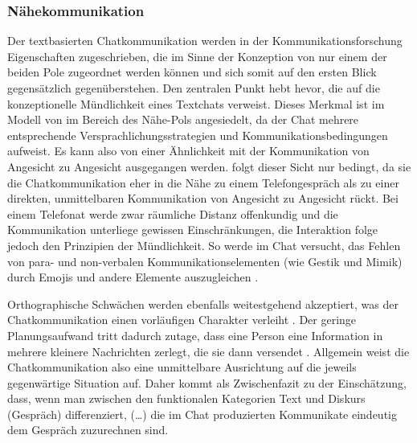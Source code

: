 \subsubsection{Nähekommunikation}
\begin{sloppypar}
Der textbasierten Chatkommunikation werden in der Kommunikationsforschung Eigenschaften zugeschrieben, die im Sinne der Konzeption von \citeauthor{koch_gesprochene_2011} nur einem der beiden Pole zugeordnet werden können und sich somit auf den ersten Blick gegensätzlich gegenüberstehen. Den zentralen Punkt hebt \citet[446]{storrer_getippte_2001} hevor, die auf die konzeptionelle Mündlichkeit eines Textchats verweist. Dieses Merkmal ist im Modell von \citeauthor{koch_gesprochene_2011} im Bereich des Nähe-Pols angesiedelt, da der Chat mehrere entsprechende Versprachlichungsstrategien und Kommunikationsbedingungen aufweist. Es kann also von einer Ähnlichkeit mit der Kommunikation von Angesicht zu Angesicht ausgegangen werden. \citet[35]{durscheid_neue_2016} folgt dieser Sicht nur bedingt, da sie die Chatkommunikation eher in die Nähe zu einem Telefongespräch als zu einer direkten, unmittelbaren Kommunikation von Angesicht zu Angesicht rückt. Bei einem Telefonat werde zwar räumliche Distanz offenkundig und die Kommunikation unterliege gewissen Einschränkungen, die Interaktion folge jedoch den Prinzipien der Mündlichkeit. So werde im Chat versucht, das Fehlen von para- und non-verbalen Kommunikationselementen (wie Gestik und Mimik) durch Emojis und andere Elemente auszugleichen \citep[3\psq]{storrer_sprachliche_2001}.

Orthographische Schwächen werden ebenfalls weitestgehend akzeptiert, was der Chatkommunikation einen vorläufigen Charakter verleiht \citep[444\psq]{storrer_getippte_2001}. Der geringe Planungsaufwand tritt dadurch zutage, dass eine Person eine Information in mehrere kleinere Nachrichten zerlegt, die sie dann versendet \citep[287]{beiswenger_chattern_2010}. Allgemein weist die Chatkommunikation also eine unmittelbare Ausrichtung auf die jeweils gegenwärtige Situation auf. Daher kommt \citep[][5]{storrer_sprachliche_2001} als Zwischenfazit zu der Einschätzung, dass, wenn man zwischen den funktionalen Kategorien Text und Diskurs (Gespräch) differenziert, (\dots) die im Chat produzierten Kommunikate eindeutig dem Gespräch zuzurechnen\grqq{} sind.
\end{sloppypar}

